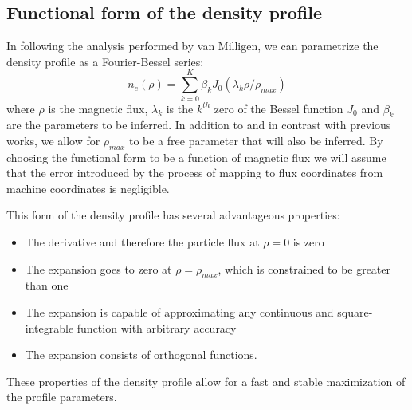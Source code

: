 \documentclass[12pt]{article}
\numberwithin{equation}{section}
\begin{document}
\subsection{Functional form of the density profile}
In following the analysis performed by van Milligen, we can 
parametrize the density profile as a Fourier-Bessel series:
\begin{equation} \label{eq:densityform}
	n_e(\rho) = \sum\limits_{k=0}^K \beta_k J_0(\lambda_k \rho/
	\rho_{max})
\end{equation}
where $\rho$ is the magnetic flux, $\lambda_k$ is the $k^{th}$ zero of 
the Bessel function $J_0$ and $\beta_k$ are the parameters to be 
inferred. In addition to and in contrast with previous works, we allow 
for $\rho_{max}$ to be a free parameter that will also be inferred. By 
choosing the functional form to be a function of magnetic flux we will 
assume that the error introduced by the process of mapping to flux 
coordinates from machine coordinates is negligible.

This form of the density profile has several advantageous properties:
\begin{itemize}
	\item The derivative and therefore the particle flux at $\rho = 0$ is zero
	\item The expansion goes to zero at $\rho = \rho_{max}$, which is constrained to be greater than one  
	\item The expansion is capable of approximating any continuous and square-integrable function with arbitrary accuracy
	\item The expansion consists of orthogonal functions.
\end{itemize}
These properties of the density profile allow for a fast and stable 
maximization of the profile parameters. 
\end{document}
